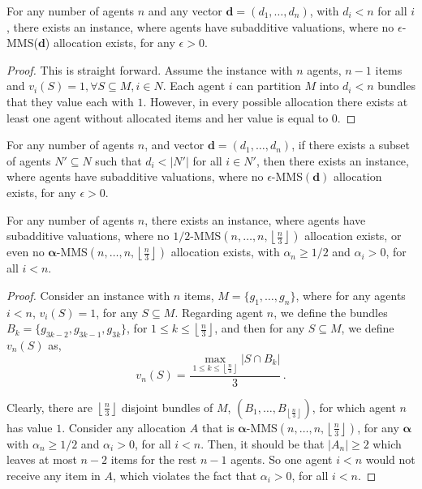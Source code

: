 \begin{lemma} 
\label{lem:nagentsImp1}
For any number of agents $n$ and any vector $\boldsymbol{d}=(d_1,\ldots, d_n)$, with $d_i< n$ for all $i$, there exists an instance, where agents have subadditive valuations, where no $\epsilon$-MMS($\boldsymbol{d}$) allocation exists, for any $\epsilon>0$.
\end{lemma}

\begin{proof}
    This is straight forward. Assume the instance with $n$ agents, $n-1$ items and $v_i\left(S\right) = 1, \forall S \subseteq M,i \in N$. Each agent $i$ can partition $M$ into $d_i< n$ bundles that they value each with $1$. However, in every possible allocation there exists at least one agent without allocated items and her value is equal to $0$.
\end{proof}

\begin{corollary}
\label{cor:d_i<k}
    For any number of agents $n$, and vector $\mathbf{d}=(d_1,\ldots, d_n)$, if there exists a subset of agents $N'\subseteq N$ such that $d_i< |N'|$ for all $i\in N'$,
    then there exists an instance, where agents have subadditive valuations, where no $\epsilon$-MMS$(\mathbf{d})$ allocation exists, for any $\epsilon>0$. 
\end{corollary}

\begin{lemma}
\label{lem:imposs(3,3,1)}
    For any number of agents $n$, there exists an instance, where agents have subadditive valuations, where no $1/2$-MMS$(n,\ldots,n,\left\lfloor \frac{n}{3} \right\rfloor)$ allocation exists, or even no $\boldsymbol{\alpha}$-MMS$(n,\ldots,n,\left\lfloor \frac{n}{3} \right\rfloor)$ allocation exists, with $\alpha_n\geq 1/2$ and $\alpha_i>0$, for all $i<n$.
\end{lemma}

\begin{proof}
    Consider an instance with $n$ items, $M=\{g_1,\ldots,g_n\}$, where for any agents $i<n$, $v_i(S)=1$, for any $S\subseteq M$. Regarding agent $n$, we define the bundles $B_k=\{g_{3k-2}, g_{3k-1},g_{3k}\}$, for $1\leq k\leq \left\lfloor \frac{n}{3} \right\rfloor$, and then for any $S\subseteq M$, we define $v_n(S)$ as,
$$v_n(S)=\frac{\max_{1\leq k \leq \left\lfloor \frac{n}{3} \right\rfloor} \lvert S\cap B_k\rvert}3 \,.$$

Clearly, there are $\left\lfloor \frac{n}{3} \right\rfloor$ disjoint bundles of $M$, $(B_1,\ldots,B_{\left\lfloor \frac{n}{3}\right\rfloor})$, for which agent $n$ has value $1$.     
Consider any allocation $A$ that is $\boldsymbol{\alpha}$-MMS$(n,\ldots,n,\left\lfloor \frac{n}{3} \right\rfloor)$, for any $\boldsymbol{\alpha}$ with  $\alpha_n\geq 1/2$ and $\alpha_i>0$, for all $i<n$. Then, it should be that $|A_n|\geq 2$ which leaves at most $n-2$ items for the rest $n-1$ agents. So one agent $i<n$ would not receive any item in $A$, which violates the fact that $\alpha_i>0$, for all $i<n$.
\end{proof}




